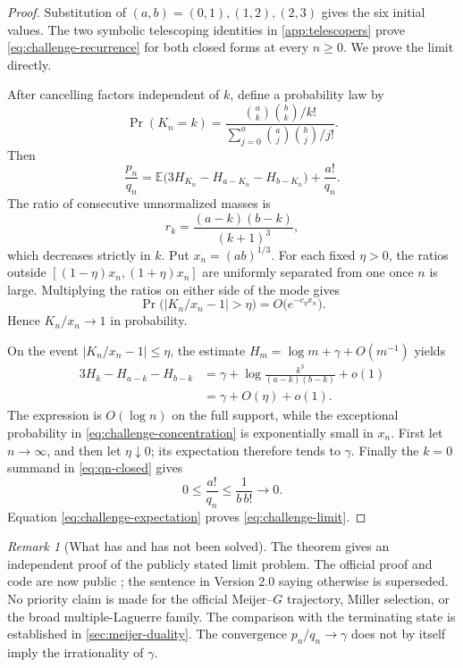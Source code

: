 \documentclass[11pt]{article}
\theoremstyle{keio}
\theoremstyle{definition}
\theoremstyle{remark}
\newtheorem{remark}[theorem]{Remark}
\begin{document}
\begin{proof}
Substitution of \((a,b)=(0,1),(1,2),(2,3)\) gives the six initial
values.  The two symbolic telescoping identities in
\cref{app:telescopers} prove \eqref{eq:challenge-recurrence} for both
closed forms at every \(n\ge0\).  We prove the limit directly.

After cancelling factors independent of \(k\), define a probability law by
\begin{equation}\label{eq:challenge-pmf}
 \Pr(K_n=k)=
 \frac{\binom ak\binom bk/k!}
 {\sum_{j=0}^{a}\binom aj\binom bj/j!}.
\end{equation}
Then
\begin{equation}\label{eq:challenge-expectation}
 \frac{p_n}{q_n}
 =\mathbb E\bigl(3H_{K_n}-H_{a-K_n}-H_{b-K_n}\bigr)
 +\frac{a!}{q_n}.
\end{equation}
The ratio of consecutive unnormalized masses is
\begin{equation}\label{eq:challenge-ratio}
 r_k=\frac{(a-k)(b-k)}{(k+1)^3},
\end{equation}
which decreases strictly in \(k\).  Put \(x_n=(ab)^{1/3}\).  For each
fixed \(\eta>0\), the ratios outside
\([(1-\eta)x_n,(1+\eta)x_n]\) are uniformly separated from one once
\(n\) is large.  Multiplying the ratios on either side of the mode gives
\begin{equation}\label{eq:challenge-concentration}
 \Pr\bigl(|K_n/x_n-1|>\eta\bigr)
 =O\bigl(e^{-c_\eta x_n}\bigr).
\end{equation}
Hence \(K_n/x_n\to1\) in probability.

On the event \(|K_n/x_n-1|\le\eta\), the estimate
\(H_m=\log m+\gamma+O(m^{-1})\) yields
\begin{align*}
 3H_k-H_{a-k}-H_{b-k}
 &=\gamma+\log\frac{k^3}{(a-k)(b-k)}+o(1)\\
 &=\gamma+O(\eta)+o(1).
\end{align*}
The expression is \(O(\log n)\) on the full support, while the exceptional
probability in \eqref{eq:challenge-concentration} is exponentially small in
\(x_n\).  First let \(n\to\infty\), and then let \(\eta\downarrow0\); its
expectation therefore tends to \(\gamma\).  Finally the
\(k=0\) summand in \eqref{eq:qn-closed} gives
\[
 0\le\frac{a!}{q_n}\le\frac1{b\,b!}\longrightarrow0.
\]
Equation \eqref{eq:challenge-expectation} proves
\eqref{eq:challenge-limit}.
\end{proof}

\begin{remark}[What has and has not been solved]
The theorem gives an independent proof of the publicly stated limit problem.
The official proof and code are now public \cite{RamanujanOfficial2026}; the
sentence in Version 2.0 saying otherwise is superseded.  No priority claim is
made for the official Meijer--\(G\) trajectory, Miller selection, or the broad
multiple-Laguerre family.  The comparison with the terminating state is
established in \cref{sec:meijer-duality}.
The convergence \(p_n/q_n\to\gamma\) does not by itself imply the
irrationality of \(\gamma\).
\end{remark}
\end{document}
